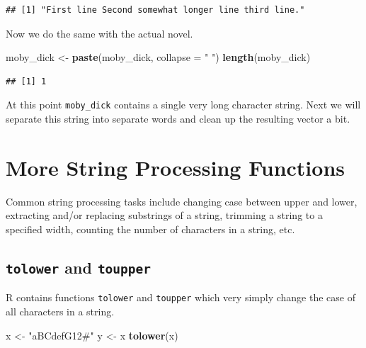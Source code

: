 \documentclass[
]{krantz}
\newenvironment{Shaded}{\begin{snugshade}}{\end{snugshade}}
\newcommand{\DataTypeTok}[1]{\textcolor[rgb]{0.13,0.29,0.53}{#1}}
\newcommand{\KeywordTok}[1]{\textcolor[rgb]{0.13,0.29,0.53}{\textbf{#1}}}
\newcommand{\NormalTok}[1]{#1}
\newcommand{\StringTok}[1]{\textcolor[rgb]{0.31,0.60,0.02}{#1}}
\begin{document}
\begin{verbatim}
## [1] "First line Second somewhat longer line third line."
\end{verbatim}

Now we do the same with the actual novel.

\begin{Shaded}
\begin{Highlighting}[]
\NormalTok{moby\_dick \textless{}{-}}\StringTok{ }\KeywordTok{paste}\NormalTok{(moby\_dick, }\DataTypeTok{collapse =} \StringTok{" "}\NormalTok{)}
\KeywordTok{length}\NormalTok{(moby\_dick)}
\end{Highlighting}
\end{Shaded}

\begin{verbatim}
## [1] 1
\end{verbatim}

At this point \texttt{moby\_dick} contains a single very long character string. Next we will separate this string into separate words and clean up the resulting vector a bit.

\hypertarget{more-string-processing-functions}{%
\section{More String Processing Functions}\label{more-string-processing-functions}}

Common string processing tasks include changing case between upper and lower, extracting and/or replacing substrings of a string, trimming a string to a specified width, counting the number of characters in a string, etc.

\hypertarget{tolower-and-toupper}{%
\subsection{\texorpdfstring{\texttt{tolower} and \texttt{toupper}}{tolower and toupper}}\label{tolower-and-toupper}}

R contains functions \texttt{tolower} and \texttt{toupper} which very simply change the case of all characters in a string.

\begin{Shaded}
\begin{Highlighting}[]
\NormalTok{x \textless{}{-}}\StringTok{ "aBCdefG12\#"}
\NormalTok{y \textless{}{-}}\StringTok{ }\NormalTok{x}
\KeywordTok{tolower}\NormalTok{(x)}
\end{Highlighting}
\end{Shaded}
\end{document}
